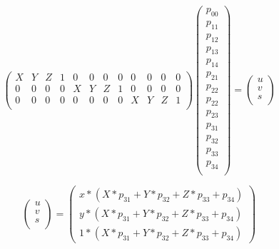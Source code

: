 \documentclass[11pt,a4paper,titlepage,oneside]{report}
\begin{document}
\setcounter{MaxMatrixCols}{15}
\begin{equation}\label{eq:projection_flat}
	\begin{pmatrix}
		X & Y & Z & 1 & 0 & 0 & 0 & 0 & 0 & 0 & 0 & 0\\
		0 & 0 & 0 & 0 & X & Y & Z & 1 & 0 & 0 & 0 & 0\\
		0 & 0 & 0 & 0 & 0 & 0 & 0 & 0 & X & Y & Z & 1\\
	\end{pmatrix}
	\begin{pmatrix}p_{00}\\
		p_{11}\\
		p_{12}\\
		p_{13}\\
		p_{14}\\
		p_{21}\\
		p_{22}\\
		p_{22}\\
		p_{23}\\
		p_{31}\\
		p_{32}\\
		p_{33}\\
		p_{34} \\
	\end{pmatrix}=
	\begin{pmatrix}u\\
		v\\
		s\\
	\end{pmatrix}
\end{equation}

\begin{equation}\label{eq:projection_flat_s}
	\begin{pmatrix}u\\
		v\\
		s\\
	\end{pmatrix}=\begin{pmatrix}
		x*(X*p_{31}+Y*p_{32}+Z*p_{33}+p_{34})\\
		y*(X*p_{31}+Y*p_{32}+Z*p_{33}+p_{34})\\
		1*(X*p_{31}+Y*p_{32}+Z*p_{33}+p_{34})
	\end{pmatrix}
\end{equation}
\end{document}
